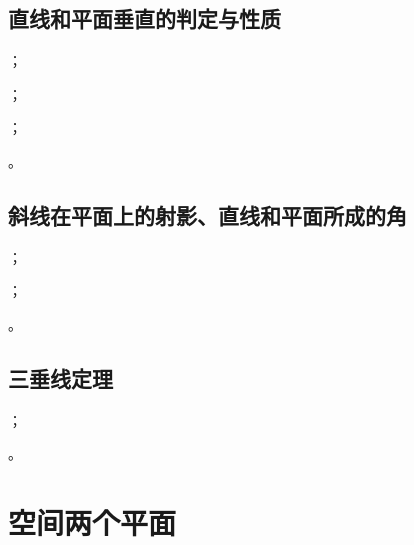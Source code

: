 \subsection{直线和平面垂直的判定与性质}
\begin{Practice}
  \begin{question}
    \item ；
    \item ；
    \item ；
    \item 。
  \end{question}
\end{Practice}
\subsection{斜线在平面上的射影、直线和平面所成的角}
\begin{Practice}
  \begin{question}
    \item ；
    \item ；
    \item 。
  \end{question}
\end{Practice}
\subsection{三垂线定理}
\begin{Practice}
  \begin{question}
    \item ；
    \item 。
  \end{question}
\end{Practice}
\begin{Exercise}
  \begin{question}
    \item 
    \item 
    \item 
    \item 
    \item 
    \item 
    \item 
    \item 
    \item 
    \item 
  \end{question}
\end{Exercise}

\section{空间两个平面}
